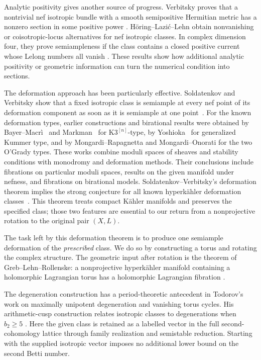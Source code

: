 Analytic positivity gives another source of progress. Verbitsky proves
that a nontrivial nef isotropic bundle with a smooth semipositive
Hermitian metric has a nonzero section in some positive power
\cite[Theorem~1.9]{VerbitskySYZ}.
H\"oring--Lazi\'c--Lehn obtain nonvanishing or coisotropic-locus
alternatives for nef isotropic classes. In complex dimension four,
they prove semiampleness if the class contains a closed positive
current whose Lelong numbers all vanish
\cite[Theorem~D and Corollary~E]{HoringLazicLehn}.
These results show how additional analytic positivity or geometric
information can turn the numerical condition into sections.

The deformation approach has been particularly effective.
Soldatenkov and Verbitsky show that a fixed isotropic class is
semiample at every nef point of its deformation component as soon
as it is semiample at one point~\cite[Theorem~3.7(v)]{SV}.
For the known deformation types, earlier constructions and birational
results were obtained by Bayer--Macr\`i~\cite[Theorem~1.5]{BayerMacri}
and Markman~\cite[Theorem~1.3 and Remark~1.8]{MarkmanFibrations}
for $\mathrm{K3}^{[n]}$-type, by Yoshioka~\cite[Proposition~3.38]{Yoshioka}
for generalized Kummer type, and by Mongardi--Rapagnetta
\cite[Theorem~7.2]{MongardiRapagnetta} and Mongardi--Onorati
\cite[Theorem~2.2]{MongardiOnorati} for the two O'Grady types.
These works combine moduli spaces of sheaves and stability conditions
with monodromy and deformation methods. Their conclusions include
fibrations on particular moduli spaces, results on the given manifold
under nefness, and fibrations on birational models.
Soldatenkov--Verbitsky's
deformation theorem implies the strong conjecture for all known
hyperk\"ahler deformation classes~\cite[Section~1.3]{SV}.
This theorem treats compact K\"ahler manifolds and preserves the
specified class; those two features are essential to our return
from a nonprojective rotation to the original pair $(X,L)$.

The task left by this deformation theorem is to produce one
semiample deformation of the \emph{prescribed} class. We do so by
constructing a torus and rotating the complex structure. The
geometric input after rotation is the theorem of Greb--Lehn--Rollenske:
a nonprojective hyperk\"ahler manifold containing a holomorphic
Lagrangian torus has a holomorphic Lagrangian fibration
\cite[Theorem~4.1]{GLR}.

The degeneration construction has a period-theoretic antecedent in
Todorov's work on maximally unipotent degeneration and vanishing torus
cycles. His arithmetic-cusp construction relates isotropic classes
to degenerations when $b_2\ge5$
\cite[Section~4]{Todorov}.
Here the given class is retained as a labelled vector in the full
second-cohomology lattice through family realization and semistable
reduction. Starting with the supplied isotropic vector imposes no
additional lower bound on the second Betti number.


